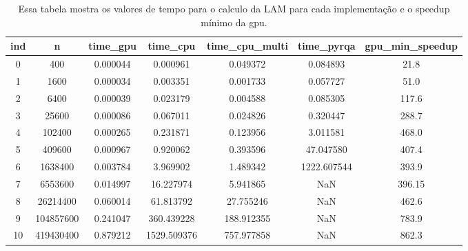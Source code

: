 \documentclass[12pt]{article}
\theoremstyle{definition}
\begin{document}
	\begin{table}[]
		\begin{tabular}{|c|c|c|c|c|c|c|}
			\hline
			ind & n         & time\_gpu & time\_cpu   & time\_cpu\_multi & time\_pyrqa & gpu\_min\_speedup \\ \hline
			0   & 400       & 0.000044  & 0.000961    & 0.049372         & 0.084893    & 21.8              \\ \hline
			1   & 1600      & 0.000034  & 0.003351    & 0.001733         & 0.057727    & 51.0              \\ \hline
			2   & 6400      & 0.000039  & 0.023179    & 0.004588         & 0.085305    & 117.6             \\ \hline
			3   & 25600     & 0.000086  & 0.067011    & 0.024826         & 0.320447    & 288.7             \\ \hline
			4   & 102400    & 0.000265  & 0.231871    & 0.123956         & 3.011581    & 468.0             \\ \hline
			5   & 409600    & 0.000967  & 0.920062    & 0.393596         & 47.047580   & 407.4             \\ \hline
			6   & 1638400   & 0.003784  & 3.969902    & 1.489342         & 1222.607544 & 393.9             \\ \hline
			7   & 6553600   & 0.014997  & 16.227974   & 5.941865         & NaN         & 396.15            \\ \hline
			8   & 26214400  & 0.060014  & 61.813792   & 27.755246        & NaN         & 462.6             \\ \hline
			9   & 104857600 & 0.241047  & 360.439228  & 188.912355       & NaN         & 783.9             \\ \hline
			10  & 419430400 & 0.879212  & 1529.509376 & 757.977858       & NaN         & 862.3             \\ \hline
		\end{tabular}
		\caption{Essa tabela mostra os valores de tempo para o calculo da LAM para cada implementação e o speedup mínimo da gpu.}
		\label{tab1}
	\end{table}
\end{document}
